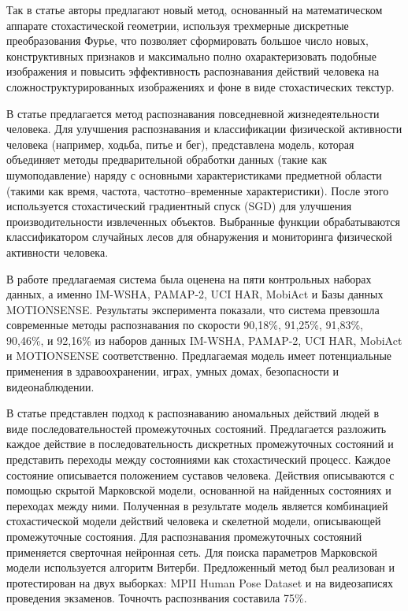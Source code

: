Так в статье \cite{stox1} авторы предлагают новый  метод, основанный на математическом аппарате стохастической геометрии, используя трехмерные дискретные преобразования Фурье, что позволяет сформировать большое число новых, конструктивных признаков и максимально полно охарактеризовать подобные изображения и повысить эффективность распознавания действий человека на сложноструктурированных изображениях и фоне в виде стохастических текстур.

В статье \cite{stox2}  предлагается метод распознавания повседневной жизнедеятельности человека.
Для улучшения распознавания и классификации физической активности человека (например,
ходьба, питье и бег), представлена модель, которая объединяет методы предварительной обработки данных (такие как шумоподавление) наряду с основными характеристиками предметной области (такими как время, частота, частотно–временные характеристики). После этого используется стохастический градиентный спуск (SGD) для улучшения
производительности извлеченных объектов. Выбранные функции обрабатываются классификатором случайных лесов
для обнаружения и мониторинга физической активности человека. 

В работе предлагаемая система была
оценена на пяти контрольных наборах данных, а именно IM-WSHA, PAMAP-2, UCI HAR, MobiAct и
Базы данных MOTIONSENSE. Результаты эксперимента показали, что система превзошла
современные методы распознавания по скорости 90,18\%, 91,25\%, 91,83\%, 90,46\%, и 92,16\%
из наборов данных IM-WSHA, PAMAP-2, UCI HAR, MobiAct и MOTIONSENSE соответственно.
Предлагаемая модель имеет потенциальные применения в здравоохранении, играх, умных домах, безопасности и видеонаблюдении.

В статье \cite{ex} представлен
подход к распознаванию аномальных действий людей в виде
последовательностей промежуточных состояний. Предлагается разложить каждое действие в последовательность дискретных промежуточных состояний и представить переходы
между состояниями как стохастический процесс. Каждое
состояние описывается положением суставов человека. Действия описываются с помощью скрытой Марковской модели, основанной на найденных состояниях и переходах между
ними. Полученная в результате модель является комбинацией стохастической модели действий человека и скелетной
модели, описывающей промежуточные состояния. Для распознавания промежуточных состояний применяется сверточная нейронная сеть. Для поиска параметров Марковской
модели используется алгоритм Витерби. Предложенный метод был реализован и протестирован на двух выборках:
MPII Human Pose Dataset и на видеозаписях проведения экзаменов. Точночть распознвания составила 75\%.




